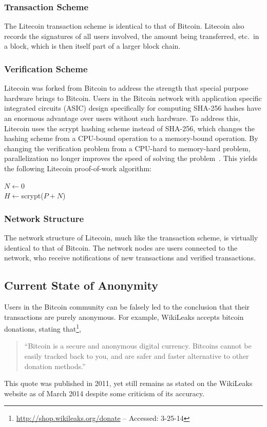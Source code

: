 \documentclass[11pt]{article}
\begin{document}
\subsubsection{Transaction Scheme}
The Litecoin transaction scheme is identical to that of
Bitcoin. Litecoin also records the signatures of all users involved, the amount
being transferred, etc.\ in a block, which is then itself part of a larger block
chain.

\subsubsection{Verification Scheme}
Litecoin was forked from Bitcoin to address the strength that special purpose
hardware brings to Bitcoin. Users in the Bitcoin network with application
specific integrated circuits (ASIC) design specifically for computing SHA-256
hashes have an enormous advantage over users without such hardware. To address
this, Litecoin uses the scrypt hashing scheme instead of SHA-256, which changes
the hashing scheme from a CPU-bound operation to a memory-bound operation. By
changing the verification problem from a CPU-hard to memory-hard problem,
parallelization no longer improves the speed of solving the
problem~\cite{percival09}. This yields the following Litecoin proof-of-work
algorithm:
\begin{algorithm}
    $N \gets 0$\\
    $H \gets ${\sc scrypt($P + N$)}\\
\end{algorithm}

\subsubsection{Network Structure}
The network structure of Litecoin, much like the transaction scheme, is
virtually identical to that of Bitcoin. The network nodes are users connected to
the network, who receive notifications of new transactions and verified
transactions.

\subsection{Current State of Anonymity}
Users in the Bitcoin community can be falsely led to the conclusion that their
transactions are purely anonymous. For example, WikiLeaks accepts bitcoin
donations, stating that\footnote{\url{http://shop.wikileaks.org/donate} --
Accessed: 3-25-14},
\begin{quote}
``Bitcoin is a secure and anonymous digital currency. Bitcoins cannot be easily
tracked back to you, and are safer and faster alternative to other donation
methods.''
\end{quote}
This quote was published in 2011, yet still remains as stated on the WikiLeaks
website as of March 2014 despite some criticism of its accuracy.
\end{document}
